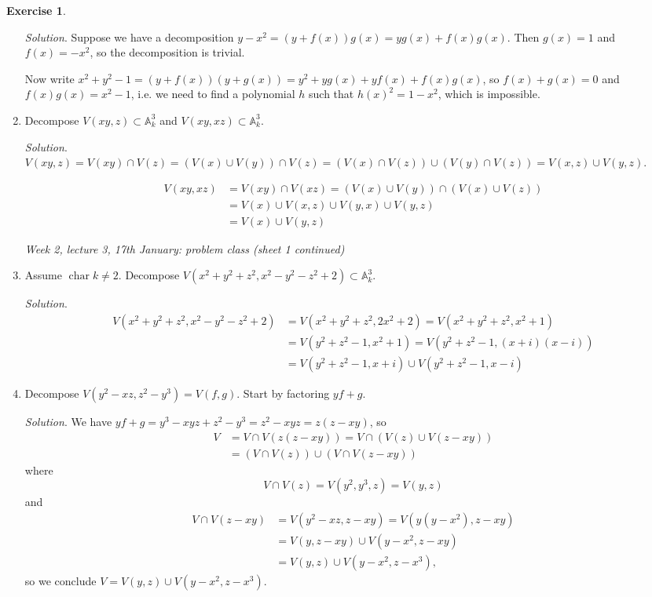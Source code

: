 \documentclass{article}
\newcommand{\A}{\mathbb{A}}
\newcommand{\Char}{\operatorname{char}}
\theoremstyle{definition}
\newtheorem{exe}[defn]{Exercise}
\begin{document}
\begin{exe}
\begin{enumerate}
\textit{Solution}. Suppose we have a decomposition $y-x^2=(y+f(x))g(x)=yg(x)+f(x)g(x)$. Then $g(x)=1$ and $f(x)=-x^2$, so the decomposition is trivial.

Now write $x^2+y^2-1=(y+f(x))(y+g(x))=y^2+yg(x)+yf(x)+f(x)g(x)$, so $f(x)+g(x)=0$ and $f(x)g(x)=x^2-1$, i.e. we need to find a polynomial $h$ such that $h(x)^2=1-x^2$, which is impossible.

\item Decompose $V(xy,z)\subset\A_k^3$ and $V(xy,xz)\subset\A_k^3$.

\textit{Solution}. $V(xy,z)=V(xy)\cap V(z)=(V(x)\cup V(y))\cap V(z)=(V(x)\cap V(z))\cup (V(y)\cap V(z))=V(x,z)\cup V(y,z)$.

\[
\begin{aligned}
V(xy,xz)&=V(xy)\cap V(xz)=(V(x)\cup V(y))\cap (V(x)\cup V(z))\\
&=V(x)\cup V(x,z)\cup V(y,x)\cup V(y,z)\\
&=V(x)\cup V(y,z)
\end{aligned}
\]

\begin{flushright}
\textit{Week 2, lecture 3, 17th January: problem class (sheet 1 continued)}
\end{flushright}

\item Assume $\Char k\neq 2$. Decompose $V(x^2+y^2+z^2,x^2-y^2-z^2+2)\subset\A_k^3$.

\textit{Solution}.
\[
\begin{aligned}
V(x^2+y^2+z^2,x^2-y^2-z^2+2)&=V(x^2+y^2+z^2,2x^2+2)=V(x^2+y^2+z^2,x^2+1)\\
&=V(y^2+z^2-1,x^2+1)=V(y^2+z^2-1,(x+i)(x-i))\\
&=V(y^2+z^2-1,x+i)\cup V(y^2+z^2-1,x-i)
\end{aligned}
\]

\item Decompose $V(y^2-xz,z^2-y^3)=V(f,g)$. Start by factoring $yf+g$.

\textit{Solution}. We have $yf+g=y^3-xyz+z^2-y^3=z^2-xyz=z(z-xy)$, so
\[
\begin{aligned}
V&=V\cap V(z(z-xy))=V\cap (V(z)\cup V(z-xy))\\
&=(V\cap V(z))\cup (V\cap V(z-xy))
\end{aligned}
\]
where
\[
V\cap V(z)=V(y^2,y^3,z)=V(y,z)
\]
and
\[
\begin{aligned}
V\cap V(z-xy)&=V(y^2-xz,z-xy)=V(y(y-x^2),z-xy)\\
&=V(y,z-xy)\cup V(y-x^2,z-xy)\\
&=V(y,z)\cup V(y-x^2,z-x^3),
\end{aligned}
\]
so we conclude $V=V(y,z)\cup V(y-x^2,z-x^3)$.


\end{enumerate}
\end{exe}
\end{document}

